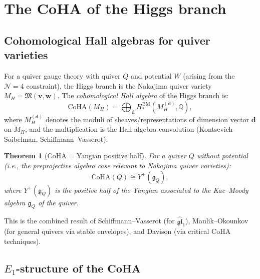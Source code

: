 \documentclass[11pt]{article}
\newtheorem{theorem}{Theorem}[section]
\theoremstyle{definition}
\theoremstyle{remark}
\newcommand{\Eone}{E_1}
\newcommand{\cN}{\mathcal{N}}
\newcommand{\frakg}{\mathfrak{g}}
\newcommand{\CoHA}{\mathrm{CoHA}}
\begin{document}
\section{The CoHA of the Higgs branch}
\label{sec:coha-higgs}

\subsection{Cohomological Hall algebras for quiver varieties}

For a quiver gauge theory with quiver $Q$ and potential $W$ (arising from the $\cN=4$ constraint), the Higgs branch is the Nakajima quiver variety $M_H = \mathfrak{M}(\mathbf{v}, \mathbf{w})$. The \emph{cohomological Hall algebra} of the Higgs branch is:
\[
 \CoHA(M_H) = \bigoplus_{\mathbf{d}} H^{\mathrm{BM}}_*(M_H^{(\mathbf{d})}, \mathbb{Q}),
\]
where $M_H^{(\mathbf{d})}$ denotes the moduli of sheaves/representations of dimension vector $\mathbf{d}$ on $M_H$, and the multiplication is the Hall-algebra convolution (Kontsevich--Soibelman, Schiffmann--Vasserot).

\begin{theorem}[CoHA = Yangian positive half]
\label{thm:coha-yangian}
For a quiver $Q$ without potential (i.e., the preprojective algebra case relevant to Nakajima quiver varieties):
\[
 \CoHA(Q) \cong Y^+(\frakg_Q),
\]
where $Y^+(\frakg_Q)$ is the positive half of the Yangian associated to the Kac--Moody algebra $\frakg_Q$ of the quiver.
\end{theorem}

This is the combined result of Schiffmann--Vasserot (for $\widehat{\mathfrak{gl}}_1$), Maulik--Okounkov (for general quivers via stable envelopes), and Davison (via critical CoHA techniques).

\subsection{$\Eone$-structure of the CoHA}
\end{document}

